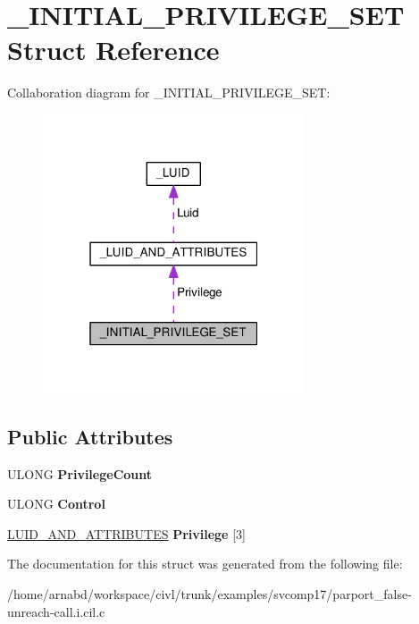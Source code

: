 \hypertarget{struct__INITIAL__PRIVILEGE__SET}{}\section{\+\_\+\+I\+N\+I\+T\+I\+A\+L\+\_\+\+P\+R\+I\+V\+I\+L\+E\+G\+E\+\_\+\+S\+E\+T Struct Reference}
\label{struct__INITIAL__PRIVILEGE__SET}


Collaboration diagram for \+\_\+\+I\+N\+I\+T\+I\+A\+L\+\_\+\+P\+R\+I\+V\+I\+L\+E\+G\+E\+\_\+\+S\+E\+T\+:
\nopagebreak
\begin{figure}[H]
\begin{center}
\leavevmode
\includegraphics[width=220pt]{struct__INITIAL__PRIVILEGE__SET__coll__graph}
\end{center}
\end{figure}
\subsection*{Public Attributes}
\begin{DoxyCompactItemize}
\item 
\hypertarget{struct__INITIAL__PRIVILEGE__SET_a3c552965faa10eef25950ca6bbd037be}{}U\+L\+O\+N\+G {\bfseries Privilege\+Count}\label{struct__INITIAL__PRIVILEGE__SET_a3c552965faa10eef25950ca6bbd037be}

\item 
\hypertarget{struct__INITIAL__PRIVILEGE__SET_a12e4e2c9ccf287e600068a1546dfc5a7}{}U\+L\+O\+N\+G {\bfseries Control}\label{struct__INITIAL__PRIVILEGE__SET_a12e4e2c9ccf287e600068a1546dfc5a7}

\item 
\hypertarget{struct__INITIAL__PRIVILEGE__SET_a9c72a0199fe99faed88f85e3a9fbd1c9}{}\hyperlink{struct__LUID__AND__ATTRIBUTES}{L\+U\+I\+D\+\_\+\+A\+N\+D\+\_\+\+A\+T\+T\+R\+I\+B\+U\+T\+E\+S} {\bfseries Privilege} \mbox{[}3\mbox{]}\label{struct__INITIAL__PRIVILEGE__SET_a9c72a0199fe99faed88f85e3a9fbd1c9}

\end{DoxyCompactItemize}


The documentation for this struct was generated from the following file\+:\begin{DoxyCompactItemize}
\item 
/home/arnabd/workspace/civl/trunk/examples/svcomp17/parport\+\_\+false-\/unreach-\/call.\+i.\+cil.\+c\end{DoxyCompactItemize}
